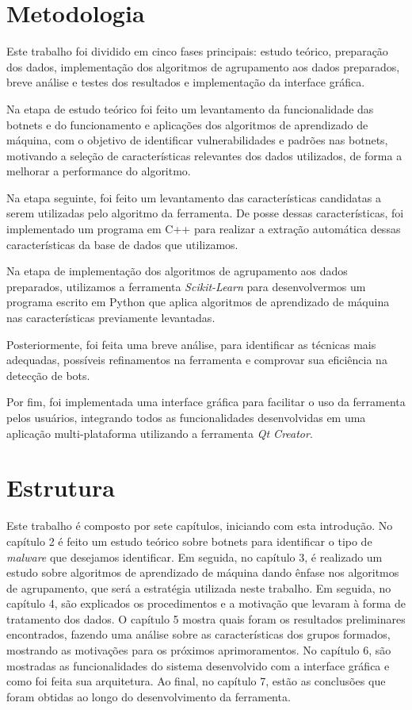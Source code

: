 \section{Metodologia}
Este trabalho foi dividido em cinco fases principais: estudo teórico, preparação dos dados, implementação dos algoritmos de agrupamento aos dados preparados, breve análise e testes dos resultados e implementação da interface gráfica. 

Na etapa de estudo teórico foi feito um levantamento da funcionalidade das botnets e do funcionamento e aplicações dos algoritmos de aprendizado de máquina, com o objetivo de identificar vulnerabilidades e padrões nas botnets, motivando a seleção de características relevantes dos dados utilizados, de forma a melhorar a performance do algoritmo.

Na etapa seguinte, foi feito um levantamento das características candidatas a serem utilizadas pelo algoritmo da ferramenta. De posse dessas características, foi implementado um programa em C++ para realizar a extração automática dessas características da base de dados que utilizamos.

Na etapa de implementação dos algoritmos de agrupamento aos dados preparados, utilizamos a ferramenta \textit{Scikit-Learn} para desenvolvermos um programa escrito em Python que aplica algoritmos de aprendizado de máquina nas características previamente levantadas.

Posteriormente, foi feita uma breve análise, para identificar as técnicas mais adequadas, possíveis refinamentos na ferramenta e comprovar sua eficiência na detecção de bots.

Por fim, foi implementada uma interface gráfica para facilitar o uso da ferramenta pelos usuários, integrando todos as funcionalidades desenvolvidas em uma aplicação multi-plataforma utilizando a ferramenta \textit{Qt Creator}.

\section{Estrutura}
Este trabalho é composto por sete capítulos, iniciando com esta introdução. No capítulo 2 é feito um estudo teórico sobre botnets para identificar o tipo de \textit{malware} que desejamos identificar. Em seguida, no capítulo 3, é realizado um estudo sobre algoritmos de aprendizado de máquina dando ênfase nos algoritmos de agrupamento, que será a estratégia utilizada neste trabalho. Em seguida, no capítulo 4, são explicados os procedimentos e a motivação que levaram à forma de tratamento dos dados. O capítulo 5 mostra quais foram os resultados preliminares encontrados, fazendo uma análise sobre as características dos grupos formados, mostrando as motivações para os próximos aprimoramentos. No capítulo 6, são mostradas as funcionalidades do sistema desenvolvido com a interface gráfica e como foi feita sua arquitetura. Ao final, no capítulo 7, estão as conclusões que foram obtidas ao longo do desenvolvimento da ferramenta.